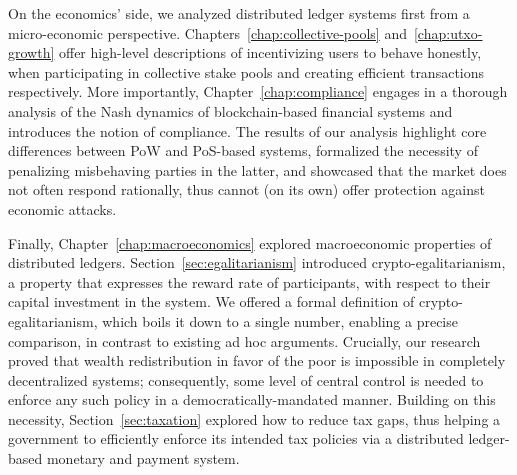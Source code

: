 On the economics' side, we analyzed distributed ledger systems first from a
micro-economic perspective. Chapters~\ref{chap:collective-pools}
and~\ref{chap:utxo-growth} offer high-level descriptions of incentivizing users
to behave honestly, when participating in collective stake pools and creating
efficient transactions respectively. More importantly,
Chapter~\ref{chap:compliance} engages in a thorough analysis of the Nash dynamics of
blockchain-based financial systems and introduces the notion of compliance. The results
of our analysis highlight core differences between PoW and PoS-based
systems, formalized the necessity of penalizing misbehaving parties in the
latter, and showcased that the market does not often respond rationally, thus
cannot (on its own) offer protection against economic attacks.

Finally, Chapter~\ref{chap:macroeconomics} explored macroeconomic properties of distributed ledgers.
Section~\ref{sec:egalitarianism} introduced crypto-egalitarianism, a property that
expresses the reward rate of participants, with respect to their
capital investment in the system. We offered a formal definition of
crypto-egalitarianism, which boils it down to a single number,
enabling a precise comparison, in contrast to existing ad
hoc arguments. Crucially, our research proved that wealth redistribution in
favor of the poor is impossible in completely decentralized systems;
consequently, some level of central control is needed to enforce any such
policy in a democratically-mandated manner. Building on this necessity,
Section~\ref{sec:taxation} explored how to reduce tax gaps, thus helping a
government to efficiently enforce its intended tax policies via a distributed
ledger-based monetary and payment system.
